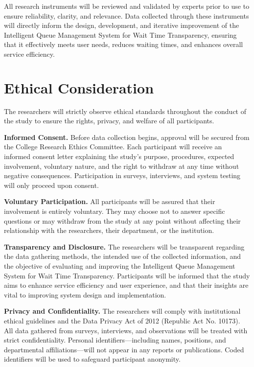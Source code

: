 \documentclass{research}
\begin{document}
\medskip
\hspace{1em}All research instruments will be reviewed and validated by experts prior to use to ensure reliability, clarity, and relevance. Data collected through these instruments will directly inform the design, development, and iterative improvement of the Intelligent Queue Management System for Wait Time Transparency, ensuring that it effectively meets user needs, reduces waiting times, and enhances overall service efficiency.

\section{Ethical Consideration}

\indent The researchers will strictly observe ethical standards throughout the conduct of the study to ensure the rights, privacy, and welfare of all participants.

\indent\textbf{Informed Consent.} Before data collection begins, approval will be secured from the College Research Ethics Committee. Each participant will receive an informed consent letter explaining the study's purpose, procedures, expected involvement, voluntary nature, and the right to withdraw at any time without negative consequences. Participation in surveys, interviews, and system testing will only proceed upon consent.

\indent\textbf{Voluntary Participation.} All participants will be assured that their involvement is entirely voluntary. They may choose not to answer specific questions or may withdraw from the study at any point without affecting their relationship with the researchers, their department, or the institution.

\indent\textbf{Transparency and Disclosure.} The researchers will be transparent regarding the data gathering methods, the intended use of the collected information, and the objective of evaluating and improving the Intelligent Queue Management System for Wait Time Transparency. Participants will be informed that the study aims to enhance service efficiency and user experience, and that their insights are vital to improving system design and implementation.

\indent\textbf{Privacy and Confidentiality.} The researchers will comply with institutional ethical guidelines and the Data Privacy Act of 2012 (Republic Act No. 10173). All data gathered from surveys, interviews, and observations will be treated with strict confidentiality. Personal identifiers---including names, positions, and departmental affiliations---will not appear in any reports or publications. Coded identifiers will be used to safeguard participant anonymity.
\end{document}
